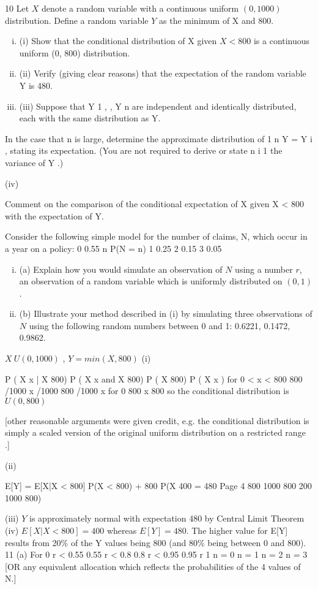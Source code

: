 \documentclass[a4paper,12pt]{article}
\begin{document}
10
Let $X$ denote a random variable with a continuous uniform $(0, 1000)$ distribution. Define a random variable $Y$ as the minimum of X and 800.

\begin{enumerate}[(i)]
\item (i) Show that the conditional distribution of X given $X < 800$ is a continuous uniform (0, 800) distribution.
\item (ii) Verify (giving clear reasons) that the expectation of the random variable Y is 480.
\item (iii) Suppose that Y 1 , , Y n are independent and identically distributed, each with the same distribution as Y.
\end{enumerate}
In the case that n is large, determine the approximate distribution of
1 n
Y =
Y i , stating its expectation. (You are not required to derive or state
n i 1
the variance of Y .)

(iv)

Comment on the comparison of the conditional expectation of X given X < 800 with the expectation of Y.

Consider the following simple model for the number of claims, N, which occur in a  year on a policy:
0
0.55
n
P(N = n)
1
0.25
2
0.15
3
0.05
\begin{enumerate}[(i)]
\item (a) Explain how you would simulate an observation of $N$ using a number $r$, an observation of a random variable which is uniformly distributed on $(0, 1)$.
\item (b) Illustrate your method described in (i) by simulating three observations of $N$ using the following random numbers between 0 and 1: 0.6221, 0.1472, 0.9862.
\end{enumerate}

$X ~ U(0,1000)$ , $Y = min(X,800)$
(i)

P ( X
x | X
800)
P ( X
x and X 800)
P ( X 800)
P ( X x )
for 0 < x < 800
800 /1000
x /1000
800 /1000
x
for 0
800
x 800
so the conditional distribution is $U(0,800)$

[other reasonable arguments were given credit, e.g. the conditional distribution is simply a scaled version of the original uniform distribution on a restricted range .]


(ii)

E[Y] = E[X|X < 800] P(X < 800) + 800 P(X
400
= 480
Page 4
800
1000
800
200
1000
800)

(iii) $Y$ is approximately normal with expectation 480 by Central Limit Theorem
(iv) $E[X | X < 800] = 400$ whereas $E[Y] = 480$.
The higher value for E[Y] results from 20\% of the Y values being 800 (and 80\% being between 0 and 800).
11
(a)
For 0 r < 0.55
0.55 r < 0.8
0.8 r < 0.95
0.95 r 1
n = 0
n = 1
n = 2
n = 3
[OR any equivalent allocation which reflects the probabilities of the 4 values
of N.]
\end{document}
